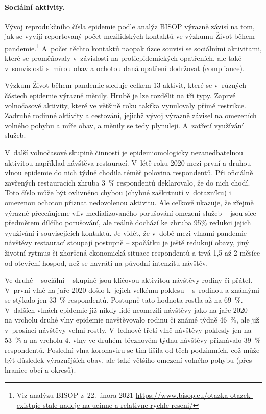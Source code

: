 \label{Socialni_aktivity}

\paragraph{Sociální aktivity.} Vývoj reprodukčního čísla epidemie podle analýz BISOP vý\-raz\-ně závisí na tom, jak se vyvíjí reportovaný počet mezilidských kontaktů ve výzkumu Život během pandemie.\footnote{Viz analýzu BISOP z 22. února 2021
\url{https://www.bisop.eu/otazka-otazek-existuje-stale-nadeje-na-ucinne-a-relativne-rychle-reseni/}} A~počet těchto kontaktů naopak úzce souvisí se sociálními aktivitami, které se proměňovaly v závislosti na protiepidemických opatřeních, ale také v~souvislosti s~mírou obav a ochotou daná opatření dodržovat (compliance).

Výzkum Život během pandemie sleduje celkem 13 aktivit, které se v~různých částech epidemie výrazně měnily. Hrubě je lze rozdělit na tři typy. Zaprvé volnočasové aktivity, které ve většině roku takřka vynulovaly přímé restrikce. Zadruhé rodinné aktivity a cestování, jejichž vývoj výrazně závisel na omezeních volného pohybu a míře obav, a měnily se tedy plynuleji. A~zatřetí využívání služeb.

V~další volnočasové skupině činností je epidemiomologicky nezanedbatelnou aktivitou například návštěva restaurací. V~létě roku 2020 mezi první a druhou vlnou epidemie do nich týdně chodila téměř polovina respondentů. Při oficiálně zavřených restauracích zhruba 3~\% respondentů deklarovalo, že do nich chodí. Toto číslo může být ovlivněno chybou (chybné zaškrtnutí v~dotazníku) i omezenou ochotou přiznat nedovolenou aktivitu. Ale celkově ukazuje, že zřejmě výrazně přeceňujeme vliv medializovaného porušování omezení služeb – jsou sice předmětem dílčího porušování, ale reálně dochází ke zhruba 95\% redukci jejich využívání i souvisejících kontaktů. Je vidět, že v~době mezi vlnami pandemie návštěvy restaurací stoupají postupně – zpočátku je ještě redukují obavy, jiný životní rytmus či zhoršená ekonomická situace respondentů a trvá 1,5 až 2 měsíce od otevření hospod, než se navrátí na původní intenzitu návštěv.

Ve druhé – sociální – skupině jsou klíčovou aktivitou návštěvy rodiny či přátel. V~první vlně na jaře 2020 došlo k~jejich velkému poklesu – s~rodinou a známými se stýkalo jen 33~\% respondentů. Postupně tato hodnota rostla až na 69~\%. V dalších vlnách epidemie
již nikdy lidé neomezili návštěvy jako na jaře 2020 – na vrcholu druhé vlny epidemie navštěvovalo rodinu či známé týdně 46~\%, ale již v~prosinci návštěvy velmi rostly. V~lednové třetí vlně návštěvy poklesly jen na 53~\% a na vrcholu 4. vlny ve druhém březnovém týdnu návštěvy přiznávalo 39~\% respondentů. Poslední vlna koronaviru se tím lišila od těch podzimních, což může být důsledek výraznějších obav, ale také většího omezení volného pohybu (přes hranice obcí a okresů).


